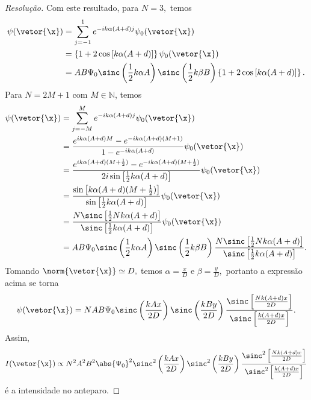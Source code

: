\begin{proof}[Resolução]
    Com este resultado, para \(N = 3,\) temos
    \begin{align*}
        \psi(\vetor{\x}) &= \sum_{j = -1}^1 e^{-ik \alpha(A + d)j} \psi_0(\vetor{\x})\\
                         &= \left\{1 + 2\cos\left[k\alpha(A + d)\right]\right\} \psi_0(\vetor{\x})\\
                         &= AB \Psi_0 \sinc\left(\frac12 k \alpha A\right)\sinc\left(\frac12 k \beta B\right) \left\{1 + 2\cos\left[k\alpha(A + d)\right]\right\}.
    \end{align*}
    Para \(N = 2M + 1\) com \(M \in \mathbb{N}\), temos
    \begin{align*}
        \psi(\vetor{\x}) &= \sum_{j = -M}^M e^{-ik \alpha(A + d)j} \psi_0(\vetor{\x})\\
                         &= \frac{e^{ik \alpha (A + d)M} - e^{-ik \alpha(A + d)(M+1)}}{1 - e^{-ik \alpha (A + d)}}\psi_0(\vetor{\x})\\
                         &= \frac{e^{ik \alpha (A + d) (M + \frac12)} - e^{-ik \alpha (A + d) (M + \frac12)}}{2i\sin\left[\frac12 k \alpha(A + d)\right]}\psi_0(\vetor{\x})\\
                         &= \frac{\sin\left[k \alpha (A + d) (M + \frac12)\right]}{\sin\left[\frac12 k \alpha (A + d)\right]} \psi_0(\vetor{\x})\\
                         &= \frac{N\sinc\left[\frac12 N k \alpha (A + d)\right]}{\sinc\left[\frac12 k \alpha (A + d)\right]} \psi_0(\vetor{\x})\\
                         &= AB \Psi_0 \sinc\left(\frac12 k \alpha A\right) \sinc\left(\frac12 k \beta B\right)\frac{N\sinc\left[\frac12 N k \alpha (A + d)\right]}{\sinc\left[\frac12 k \alpha (A + d)\right]}.
    \end{align*}
    Tomando \(\norm{\vetor{\x}} \simeq D,\) temos \(\alpha = \frac{x}{D}\) e \(\beta = \frac{y}{D},\) portanto a expressão acima se torna
    \begin{equation*}
        \psi(\vetor{\x}) = NAB \Psi_0 \sinc\left(\frac{k A x}{2 D}\right) \sinc\left(\frac{k B y}{2D}\right)\frac{\sinc\left[\frac{N k (A + d) x}{2D}\right]}{\sinc\left[\frac{k (A + d) x}{2D}\right]}.
    \end{equation*}
    Assim,
    \begin{equation*}
        I(\vetor{\x}) \propto N^2 A^2B^2 \abs{\Psi_0}^2 \sinc^2\left(\frac{k A x}{2 D}\right) \sinc^2\left(\frac{k B y}{2D}\right)\frac{\sinc^2\left[\frac{N k (A + d) x}{2D}\right]}{\sinc^2\left[\frac{k (A + d) x}{2D}\right]}
    \end{equation*}
    é a intensidade no anteparo.
\end{proof}

